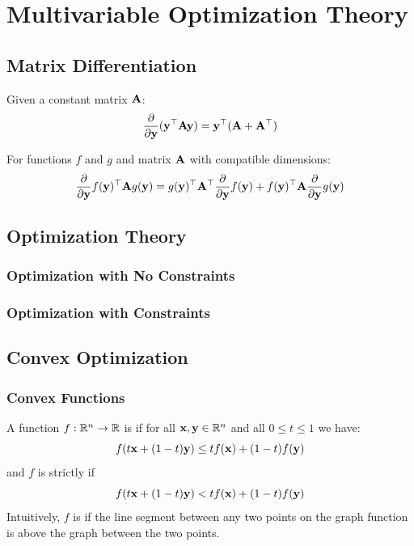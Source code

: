 \chapter{Multivariable Optimization Theory}

\section{Matrix Differentiation}

\begin{theorem}
    Given a constant matrix $\MA$:
    $$\frac{\partial}{\partial\vy}(\vy^\top\MA\vy) = \vy^\top(\MA + \MA^\top)$$
\end{theorem}
\begin{theorem}
    For functions $f$ and $g$ and matrix $\MA$ with compatible dimensions:
    $$\frac{\partial}{\partial\vy}f(\vy)^\top\MA g(\vy) = g(\vy)^\top\MA^\top\frac{\partial}{\partial\vy}f(\vy) + f(\vy)^\top\MA\frac{\partial}{\partial\vy}g(\vy)$$
\end{theorem}

\section{Optimization Theory} \label{optim}

\subsection{Optimization with No Constraints} 

\subsection{Optimization with Constraints} 

\section{Convex Optimization} 


\subsection{Convex Functions}
\label{convex-functions}
\begin{definition}
    \label{def-convexity}
    A function $f : \R^n \rightarrow \R$ is  if for all $\vx, \vy \in \R^n$ and all $0 \leq t \leq 1$ we have:
    $$f(t\vx + (1-t)\vy) \leq tf(\vx) + (1-t)f(\vy)$$
    and $f$ is strictly \cvx{} if
    $$f(t\vx + (1-t)\vy) < tf(\vx) + (1-t)f(\vy)$$
    Intuitively, $f$ is  if the line segment between any two points on the graph function is above the graph between the two points.
\end{definition}

